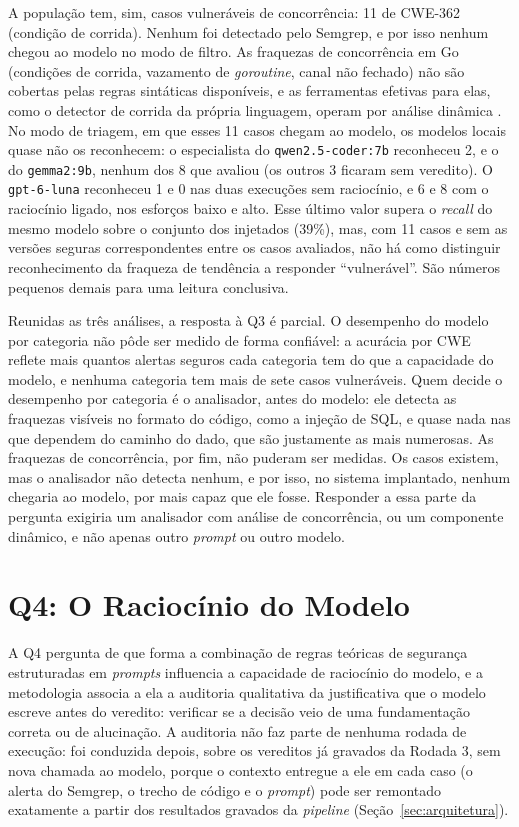 A população tem, sim, casos vulneráveis de concorrência: 11 de CWE-362 (condição de corrida). Nenhum foi detectado pelo Semgrep, e por isso nenhum chegou ao modelo no modo de filtro. As fraquezas de concorrência em Go (condições de corrida, vazamento de \textit{goroutine}, canal não fechado) não são cobertas pelas regras sintáticas disponíveis, e as ferramentas efetivas para elas, como o detector de corrida da própria linguagem, operam por análise dinâmica \cite{tu2019understanding}. No modo de triagem, em que esses 11 casos chegam ao modelo, os modelos locais quase não os reconhecem: o especialista do \texttt{qwen2.5-coder:7b} reconheceu 2, e o do \texttt{gemma2:9b}, nenhum dos 8 que avaliou (os outros 3 ficaram sem veredito). O \texttt{gpt-6-luna} reconheceu 1 e 0 nas duas execuções sem raciocínio, e 6 e 8 com o raciocínio ligado, nos esforços baixo e alto. Esse último valor supera o \textit{recall} do mesmo modelo sobre o conjunto dos injetados (39\%), mas, com 11 casos e sem as versões seguras correspondentes entre os casos avaliados, não há como distinguir reconhecimento da fraqueza de tendência a responder ``vulnerável''. São números pequenos demais para uma leitura conclusiva.

Reunidas as três análises, a resposta à Q3 é parcial. O desempenho do modelo por categoria não pôde ser medido de forma confiável: a acurácia por CWE reflete mais quantos alertas seguros cada categoria tem do que a capacidade do modelo, e nenhuma categoria tem mais de sete casos vulneráveis. Quem decide o desempenho por categoria é o analisador, antes do modelo: ele detecta as fraquezas visíveis no formato do código, como a injeção de SQL, e quase nada nas que dependem do caminho do dado, que são justamente as mais numerosas. As fraquezas de concorrência, por fim, não puderam ser medidas. Os casos existem, mas o analisador não detecta nenhum, e por isso, no sistema implantado, nenhum chegaria ao modelo, por mais capaz que ele fosse. Responder a essa parte da pergunta exigiria um analisador com análise de concorrência, ou um componente dinâmico, e não apenas outro \textit{prompt} ou outro modelo.

\section{Q4: O Raciocínio do Modelo}
\label{sec:q4}

A Q4 pergunta de que forma a combinação de regras teóricas de segurança estruturadas em \textit{prompts} influencia a capacidade de raciocínio do modelo, e a metodologia associa a ela a auditoria qualitativa da justificativa que o modelo escreve antes do veredito: verificar se a decisão veio de uma fundamentação correta ou de alucinação. A auditoria não faz parte de nenhuma rodada de execução: foi conduzida depois, sobre os vereditos já gravados da Rodada 3, sem nova chamada ao modelo, porque o contexto entregue a ele em cada caso (o alerta do Semgrep, o trecho de código e o \textit{prompt}) pode ser remontado exatamente a partir dos resultados gravados da \textit{pipeline} (Seção~\ref{sec:arquitetura}).

